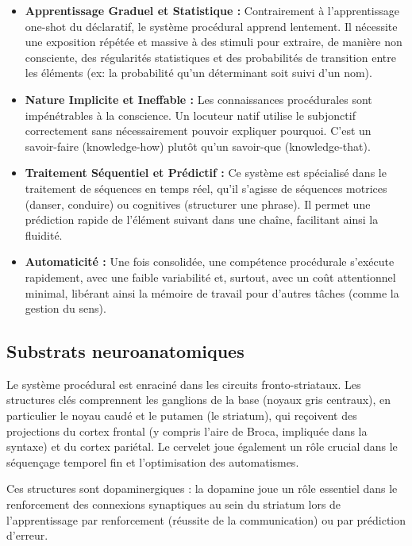 \begin{itemize}\item \textbf{Apprentissage Graduel et Statistique :} Contrairement à l'apprentissage \og one-shot\fg{} du déclaratif, le système procédural apprend lentement. Il nécessite une exposition répétée et massive à des stimuli pour extraire, de manière non consciente, des régularités statistiques et des probabilités de transition entre les éléments (ex: la probabilité qu'un déterminant soit suivi d'un nom).\cite{II-2-2-ref7}\item \textbf{Nature Implicite et Ineffable :} Les connaissances procédurales sont impénétrables à la conscience. Un locuteur natif utilise le subjonctif correctement sans nécessairement pouvoir expliquer pourquoi. C'est un \og savoir-faire\fg{} (knowledge-how) plutôt qu'un \og savoir-que\fg{} (knowledge-that).\item \textbf{Traitement Séquentiel et Prédictif :} Ce système est spécialisé dans le traitement de séquences en temps réel, qu'il s'agisse de séquences motrices (danser, conduire) ou cognitives (structurer une phrase). Il permet une prédiction rapide de l'élément suivant dans une chaîne, facilitant ainsi la fluidité.\cite{II-2-2-ref2}\item \textbf{Automaticité :} Une fois consolidée, une compétence procédurale s'exécute rapidement, avec une faible variabilité et, surtout, avec un coût attentionnel minimal, libérant ainsi la mémoire de travail pour d'autres tâches (comme la gestion du sens).\end{itemize}

\subsection{Substrats neuroanatomiques}

Le système procédural est enraciné dans les circuits fronto-striataux. Les structures clés
comprennent les ganglions de la base (noyaux gris centraux), en particulier le noyau caudé et le
putamen (le striatum), qui reçoivent des projections du cortex frontal (y compris l'aire de Broca,
impliquée dans la syntaxe) et du cortex pariétal. Le cervelet joue également un rôle crucial dans le
séquençage temporel fin et l'optimisation des automatismes.\cite{II-2-2-ref4}

Ces structures sont dopaminergiques : la dopamine joue un rôle essentiel dans le renforcement des
connexions synaptiques au sein du striatum lors de l'apprentissage par renforcement (réussite de la
communication) ou par prédiction d'erreur.\cite{II-2-2-ref8}




